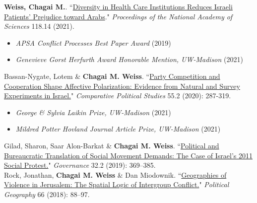 \documentclass[11pt]{article}
\begin{document}
 \textbf{Weiss, Chagai M.}. ``\href{https://www.pnas.org/content/118/14/e2022634118}{Diversity in Health Care Institutions Reduces Israeli Patients' Prejudice toward Arabs}." \emph{Proceedings of the National Academy of Sciences} 118.14 (2021).
 \begin{itemize}[label=$\star$]
 \item \emph{APSA Conflict Processes Best Paper Award} (2019)
 \item \emph{Genevieve Gorst Herfurth Award Honorable Mention, UW-Madison} (2021)
\end{itemize}
Bassan-Nygate, Lotem \& \textbf{Chagai M. Weiss}. ``\href{https://journals.sagepub.com/doi/full/10.1177/00104140211024283}{Party Competition and Cooperation Shape Affective Polarization: Evidence from Natural and Survey Experiments in Israel.}" \emph{Comparative Political Studies} 55.2 (2020): 287-319.
    \begin{itemize}[label=$\star$]
 \item \emph{George \& Sylvia Laikin Prize, UW-Madison} (2021)
  \item \emph{Mildred Potter Hovland Journal Article Prize, UW-Madison} (2021)
 \end{itemize}
 
 Gilad, Sharon, Saar Alon-Barkat \& \textbf{Chagai M. Weiss}. ``\href{https://onlinelibrary.wiley.com/doi/abs/10.1111/gove.12383}{Political and Bureaucratic Translation of Social Movement Demands: The Case of Israel's 2011 Social Protest.}" \textit{Governance} 32.2 (2019): 369--385.\\
 
 Rock, Jonathan, \textbf{Chagai M. Weiss} \& Dan Miodownik. ``\href{https://www.sciencedirect.com/science/article/pii/S0962629817303323}{Geographies of Violence in Jerusalem: The Spatial Logic of Intergroup Conflict.}" \textit{Political Geography} 66 (2018): 88--97.

             
               
\end{document}
